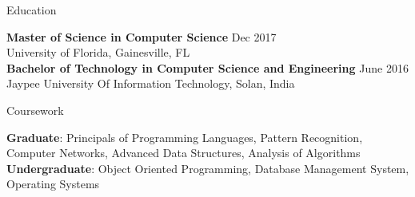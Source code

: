 \documentclass{resume} %
\begin{document}





\begin{rSection}{Education}

{\bf Master of Science in Computer Science } \hfill {Dec 2017}
\\ 
University of Florida, Gainesville, FL 
\\
{\bf Bachelor of Technology in Computer Science and Engineering} \hfill {June 2016}
\\
Jaypee University Of Information Technology, Solan, India  
\end{rSection}




\begin{rSection}{Coursework}

{\bf Graduate}: Principals of Programming Languages, Pattern Recognition, Computer Networks, Advanced Data Structures, Analysis of Algorithms 
\\ 
{\bf Undergraduate}: Object Oriented Programming, Database Management System, Operating Systems
\end{rSection}



\end{document}
